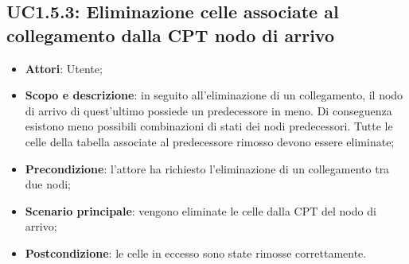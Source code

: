 \subsection{UC1.5.3: Eliminazione celle associate al collegamento dalla CPT nodo di arrivo} 
\hypertarget{UC1.5.3}{} 
\begin{itemize} 
	\item{\textbf{Attori}: Utente;} 
	\item{\textbf{Scopo e descrizione}: in seguito all'eliminazione di un collegamento, il nodo di arrivo di quest'ultimo possiede un predecessore in meno. Di conseguenza esistono meno possibili combinazioni di stati dei nodi predecessori. Tutte le celle della tabella associate al predecessore rimosso devono essere eliminate;} 
	\item{\textbf{Precondizione}: l'attore ha richiesto l'eliminazione di un collegamento tra due nodi;} 
	\item{\textbf{Scenario principale}: vengono eliminate le celle dalla CPT del nodo di arrivo;}  
	\item{\textbf{Postcondizione}: le celle in eccesso sono state rimosse correttamente.} 
\end{itemize} 
